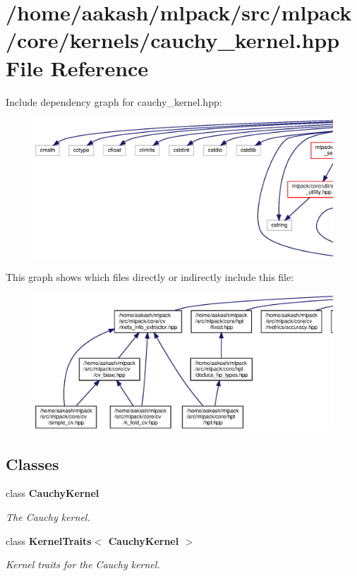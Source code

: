 \section{/home/aakash/mlpack/src/mlpack/core/kernels/cauchy\+\_\+kernel.hpp File Reference}
\label{cauchy__kernel_8hpp}
Include dependency graph for cauchy\+\_\+kernel.\+hpp\+:
\nopagebreak
\begin{figure}[H]
\begin{center}
\leavevmode
\includegraphics[width=350pt]{cauchy__kernel_8hpp__incl}
\end{center}
\end{figure}
This graph shows which files directly or indirectly include this file\+:
\nopagebreak
\begin{figure}[H]
\begin{center}
\leavevmode
\includegraphics[width=350pt]{cauchy__kernel_8hpp__dep__incl}
\end{center}
\end{figure}
\subsection*{Classes}
\begin{DoxyCompactItemize}
\item 
class \textbf{ Cauchy\+Kernel}
\begin{DoxyCompactList}\small\item\em The Cauchy kernel. \end{DoxyCompactList}\item 
class \textbf{ Kernel\+Traits$<$ Cauchy\+Kernel $>$}
\begin{DoxyCompactList}\small\item\em Kernel traits for the Cauchy kernel. \end{DoxyCompactList}\end{DoxyCompactItemize}

